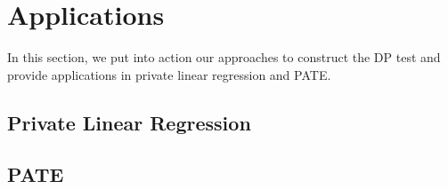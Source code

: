 \section{Applications}
\label{sections:applications}
In this section, we put into action our approaches to construct the DP test and provide applications in private linear regression and PATE.











\subsection{Private Linear Regression}


\label{subsections:private_linear_regression}




\subsection{PATE}
\label{subsections:pate}

